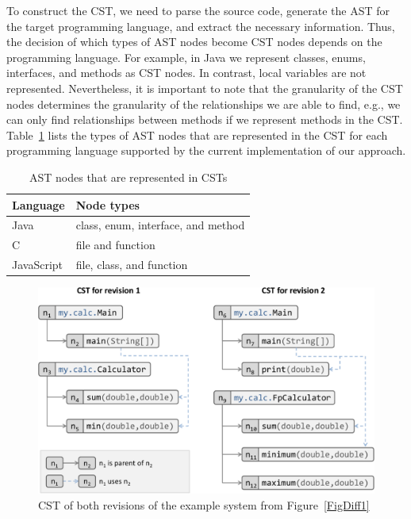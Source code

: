 \documentclass[10pt,journal,compsoc]{IEEEtran}
\begin{document}
To construct the CST, we need to parse the source code, generate the AST for the target programming language, and extract the necessary information.
Thus, the decision of which types of AST nodes become CST nodes depends on the programming language.
For example, in Java we represent classes, enums, interfaces, and methods as CST nodes.
In contrast, local variables are not represented.
Nevertheless, it is important to note that the granularity of the CST nodes determines the granularity of the relationships we are able to find, e.g., we can only find relationships between methods if we represent methods in the CST.
Table~\ref{TabCstNodes} lists the types of AST nodes that are represented in the CST for each programming language supported by the current implementation of our approach.

\begin{table}[htbp]
\renewcommand{\arraystretch}{1.2}
\caption{AST nodes that are represented in CSTs}
\label{TabCstNodes}
\centering
\begin{tabular}{@{}ll@{}}
\toprule
Language & Node types \\
\midrule
Java & class, enum, interface, and method \\
C & file and function \\
JavaScript & file, class, and function \\
\bottomrule
\end{tabular}
\end{table}

\begin{figure}[htb]
\centering
\includegraphics[width=1.0\linewidth]{img-cstDiff1.pdf}
\caption{CST of both revisions of the example system from Figure~\ref{FigDiff1}}
\label{FigJavaToCst}
\end{figure}
\end{document}
